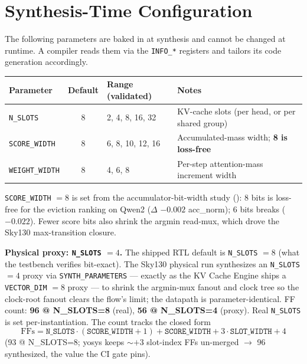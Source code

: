 \documentclass[11pt]{article}
\begin{document}
\section{Synthesis-Time Configuration}
\label{sec:syntime}

The following parameters are baked in at synthesis and cannot be changed at
runtime. A compiler reads them via the \texttt{INFO\_*} registers and tailors its
code generation accordingly.

\begin{table}[h]
\centering
\small
\begin{tabular}{@{}l c l p{5.5cm}@{}}
\toprule
Parameter          & Default & Range (validated)      & Notes \\
\midrule
\texttt{N\_SLOTS}     & 8 & 2, 4, 8, 16, 32   & KV-cache slots (per head, or per shared group) \\
\texttt{SCORE\_WIDTH} & 8 & 6, 8, 10, 12, 16  & Accumulated-mass width; \textbf{8 is loss-free} \\
\texttt{WEIGHT\_WIDTH}& 8 & 4, 6, 8           & Per-step attention-mass increment width \\
\bottomrule
\end{tabular}
\end{table}

\noindent \texttt{SCORE\_WIDTH} $=8$ is set from the accumulator-bit-width study
(): 8 bits is loss-free for the eviction
ranking on Qwen2 ($\Delta$ $-0.002$ acc\_norm); 6 bits breaks ($-0.022$). Fewer
score bits also shrink the argmin read-mux, which drove the Sky130 max-transition
closure.

\medskip
\noindent\textbf{Physical proxy: \texttt{N\_SLOTS} $=4$.} The shipped RTL default
is \texttt{N\_SLOTS} $=8$ (what the testbench verifies bit-exact). The Sky130
physical run synthesizes an \texttt{N\_SLOTS} $=4$ proxy via
\texttt{SYNTH\_PARAMETERS} --- exactly as the KV Cache Engine ships a
\texttt{VECTOR\_DIM} $=8$ proxy --- to shrink the argmin-mux fanout and clock
tree so the clock-root fanout clears the flow's limit; the datapath is
parameter-identical. FF count: \textbf{96 @ N\_SLOTS=8} (real),
\textbf{56 @ N\_SLOTS=4} (proxy). Real \texttt{N\_SLOTS} is set
per-instantiation. The count tracks the closed form
\[
  \mathrm{FFs} = \texttt{N\_SLOTS}\cdot(\texttt{SCORE\_WIDTH}{+}1) + \texttt{SCORE\_WIDTH} + 3\cdot\texttt{SLOT\_WIDTH} + 4
\]
(93 @ N\_SLOTS=8; yosys keeps $\sim{+}3$ slot-index FFs un-merged $\to$ 96
synthesized, the value the CI gate pins).
\end{document}
